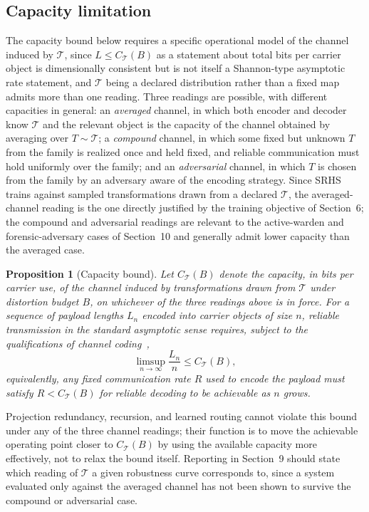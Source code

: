 \documentclass[11pt]{article}
\newtheorem{proposition}{Proposition}
\begin{document}
\subsection{Capacity limitation}

The capacity bound below requires a specific operational model of the channel induced by $\mathcal{T}$, since $L \le C_{\mathcal{T}}(B)$ as a statement about total bits per carrier object is dimensionally consistent but is not itself a Shannon-type asymptotic rate statement, and $\mathcal{T}$ being a declared distribution rather than a fixed map admits more than one reading. Three readings are possible, with different capacities in general: an \emph{averaged} channel, in which both encoder and decoder know $\mathcal{T}$ and the relevant object is the capacity of the channel obtained by averaging over $T \sim \mathcal{T}$; a \emph{compound} channel, in which some fixed but unknown $T$ from the family is realized once and held fixed, and reliable communication must hold uniformly over the family; and an \emph{adversarial} channel, in which $T$ is chosen from the family by an adversary aware of the encoding strategy. Since SRHS trains against sampled transformations drawn from a declared $\mathcal{T}$, the averaged-channel reading is the one directly justified by the training objective of Section~6; the compound and adversarial readings are relevant to the active-warden and forensic-adversary cases of Section~10 and generally admit lower capacity than the averaged case.

\begin{proposition}[Capacity bound]
\label{prop:capacity}
Let $C_{\mathcal{T}}(B)$ denote the capacity, in bits per carrier use, of the channel induced by transformations drawn from $\mathcal{T}$ under distortion budget $B$, on whichever of the three readings above is in force. For a sequence of payload lengths $L_n$ encoded into carrier objects of size $n$, reliable transmission in the standard asymptotic sense requires, subject to the qualifications of channel coding~\cite{shannon1948},
\[
\limsup_{n\to\infty} \frac{L_n}{n} \le C_{\mathcal{T}}(B),
\]
equivalently, any fixed communication rate $R$ used to encode the payload must satisfy $R < C_{\mathcal{T}}(B)$ for reliable decoding to be achievable as $n$ grows.
\end{proposition}

Projection redundancy, recursion, and learned routing cannot violate this bound under any of the three channel readings; their function is to move the achievable operating point closer to $C_{\mathcal{T}}(B)$ by using the available capacity more effectively, not to relax the bound itself. Reporting in Section~9 should state which reading of $\mathcal{T}$ a given robustness curve corresponds to, since a system evaluated only against the averaged channel has not been shown to survive the compound or adversarial case.
\end{document}
